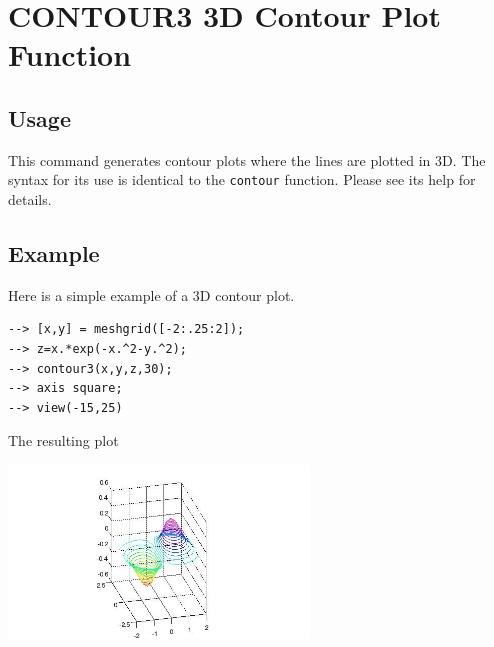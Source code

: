 \section{CONTOUR3 3D Contour Plot Function}

\subsection{Usage}

This command generates contour plots where the lines are plotted in 3D.
The syntax for its use is identical to the \verb|contour| function.  Please
see its help for details.
\subsection{Example}

Here is a simple example of a 3D contour plot.
\begin{verbatim}
--> [x,y] = meshgrid([-2:.25:2]);
--> z=x.*exp(-x.^2-y.^2);
--> contour3(x,y,z,30);
--> axis square;
--> view(-15,25)
\end{verbatim}
The resulting plot


\centerline{\includegraphics[width=8cm]{contour3_1}}

